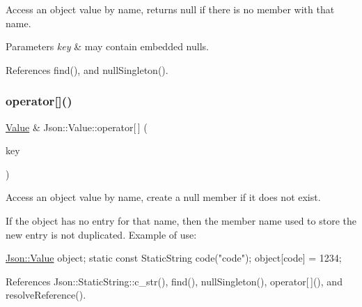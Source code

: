 Access an object value by name, returns null if there is no member with that name. 
\begin{DoxyParams}{Parameters}
{\em key} & may contain embedded nulls. \\
\hline
\end{DoxyParams}


References find(), and null\+Singleton().

\mbox{\label{classJson_1_1Value_ac3763d7d315ca65dc188e273722f7955_ac3763d7d315ca65dc188e273722f7955}} 
\subsubsection{\texorpdfstring{operator[]()}{operator[]()}\hspace{0.1cm}{\footnotesize\ttfamily [9/9]}}
{\footnotesize\ttfamily \hyperlink{classJson_1_1Value}{Value} \& Json\+::\+Value\+::operator\mbox{[}$\,$\mbox{]} (\begin{DoxyParamCaption}\item[{const \hyperlink{classJson_1_1StaticString}{Static\+String} \&}]{key }\end{DoxyParamCaption})}



Access an object value by name, create a null member if it does not exist. 

If the object has no entry for that name, then the member name used to store the new entry is not duplicated. Example of use\+: 
\begin{DoxyCode}
\hyperlink{classJson_1_1Value}{Json::Value} object;
\textcolor{keyword}{static} \textcolor{keyword}{const} StaticString code(\textcolor{stringliteral}{"code"});
\textcolor{keywordtype}{object}[code] = 1234;
\end{DoxyCode}
 

References Json\+::\+Static\+String\+::c\+\_\+str(), find(), null\+Singleton(), operator\mbox{[}$\,$\mbox{]}(), and resolve\+Reference().

\mbox{\label{classJson_1_1Value_ae9e67e08a85a2f3be3396ec0f4c47f65_ae9e67e08a85a2f3be3396ec0f4c47f65}} 
